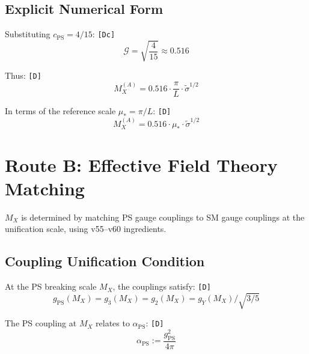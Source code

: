 \documentclass[11pt,a4paper]{article}
\newcommand{\tagD}{\textcolor{green!50!black}{\texttt{[D]}}}
\newcommand{\tagDc}{\textcolor{blue!70!black}{\texttt{[Dc]}}}
\theoremstyle{definition}
\begin{document}
\subsection{Explicit Numerical Form}
\label{subsec:explicit-numerical-a}

Substituting $c_{\text{PS}} = 4/15$: \tagDc{}
\begin{equation}
\label{eq:g-explicit}
\mathcal{G} = \sqrt{\frac{4}{15}} \approx 0.516
\end{equation}

Thus: \tagD{}
\begin{equation}
\label{eq:mx-route-a-explicit}
M_X^{(A)} = 0.516 \cdot \frac{\pi}{L} \cdot \tilde{\sigma}^{1/2}
\end{equation}

In terms of the reference scale $\mu_* = \pi/L$: \tagD{}
\begin{equation}
\label{eq:mx-route-a-mustar}
\boxed{M_X^{(A)} = 0.516 \cdot \mu_* \cdot \tilde{\sigma}^{1/2}}
\end{equation}

\section{Route B: Effective Field Theory Matching}
\label{sec:route-b}

\begin{routebox}
$M_X$ is determined by matching PS gauge couplings to SM gauge couplings
at the unification scale, using v55--v60 ingredients.
\end{routebox}

\subsection{Coupling Unification Condition}
\label{subsec:coupling-unification}

At the PS breaking scale $M_X$, the couplings satisfy: \tagD{}
\begin{equation}
\label{eq:coupling-matching}
g_{\text{PS}}(M_X) = g_3(M_X) = g_2(M_X) = g_Y(M_X) / \sqrt{3/5}
\end{equation}

The PS coupling at $M_X$ relates to $\alpha_{\text{PS}}$: \tagD{}
\begin{equation}
\label{eq:alpha-ps-def}
\alpha_{\text{PS}} := \frac{g_{\text{PS}}^2}{4\pi}
\end{equation}
\end{document}

